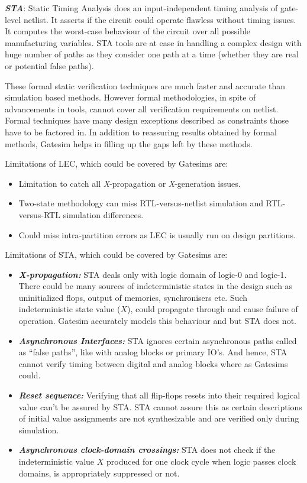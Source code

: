 \emph {\bf STA}: Static Timing Analysis does an input-independent timing analysis of gate-level netlist. It asserts if the circuit could operate flawless without timing issues. It computes the worst-case behaviour of the circuit over all possible manufacturing variables. STA tools are at ease in handling a complex design with huge number of paths as they consider one path at a time (whether they are real or potential false paths). 



These formal static verification techniques are much faster and accurate than simulation based methods. However formal methodologies, in spite of advancements in tools, cannot cover all verification requirements on netlist. Formal techniques have many design exceptions described as constraints those have to be factored in. In addition to reassuring results obtained by formal methods, Gatesim helps in filling up the gaps left by these methods. 

Limitations of LEC, which could be covered by Gatesims are:
\begin{itemize}
	\item Limitation to catch all {\it X}-propagation or {\it X}-generation issues.
	\item Two-state methodology can miss RTL-versus-netlist simulation and RTL-versus-RTL simulation differences.
	\item Could miss intra-partition errors as LEC is usually run on design partitions.
\end{itemize}

Limitations of STA, which could be covered by Gatesims are:
\begin{itemize}
	\item \emph{\bf X-propagation:} STA deals only with logic domain of logic-0 and logic-1. There could be many sources of indeterministic states in the design such as uninitialized flops, output of memories, synchronisers etc. Such indeterministic state value ($X$), could propagate through and cause failure of operation. Gatesim accurately models this behaviour and but STA does not.
	\item \emph{\bf Asynchronous Interfaces:} STA ignores certain asynchronous paths called as ``false paths'', like with analog blocks or primary IO's. And hence, STA cannot verify timing between digital and analog blocks where as Gatesims could.
	\item \emph{\bf Reset sequence:} Verifying that all flip-flops resets into their required logical value can't be assured by STA. STA cannot assure this as certain descriptions of initial value assignments are not synthesizable and are verified only during simulation.
	\item \emph{\bf Asynchronous clock-domain crossings:} STA does not check if the indeterministic value $X$ produced for one clock cycle when logic passes clock domains, is appropriately suppressed or not.
\end{itemize}


